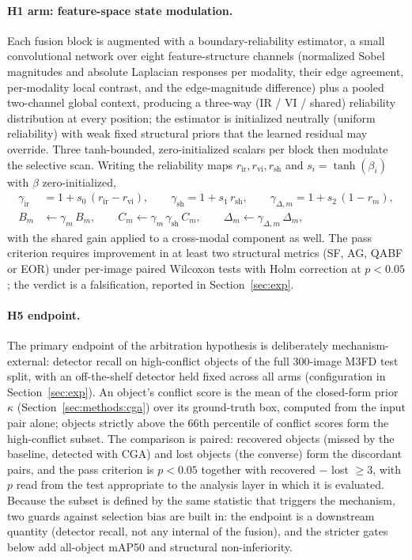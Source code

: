 \documentclass[pdflatex,sn-mathphys-num]{sn-jnl}
\theoremstyle{thmstyleone}%
\theoremstyle{thmstyletwo}%
\theoremstyle{thmstylethree}%
\begin{document}
\paragraph{H1 arm: feature-space state modulation.}
Each fusion block is augmented with a boundary-reliability estimator, a small convolutional network over eight feature-structure channels (normalized Sobel magnitudes and absolute Laplacian responses per modality, their edge agreement, per-modality local contrast, and the edge-magnitude difference) plus a pooled two-channel global context, producing a three-way (IR / VI / shared) reliability distribution at every position; the estimator is initialized neutrally (uniform reliability) with weak fixed structural priors that the learned residual may override. Three tanh-bounded, zero-initialized scalars per block then modulate the selective scan. Writing the reliability maps $r_{\mathrm{ir}}, r_{\mathrm{vi}}, r_{\mathrm{sh}}$ and $s_i = \tanh(\beta_i)$ with $\beta$ zero-initialized,
\begin{align}
\gamma_{\mathrm{ir}} &= 1 + s_0\,(r_{\mathrm{ir}} - r_{\mathrm{vi}}), \qquad \gamma_{\mathrm{sh}} = 1 + s_1\, r_{\mathrm{sh}}, \qquad \gamma_{\Delta,m} = 1 + s_2\,(1 - r_m), \nonumber\\
B_m &\leftarrow \gamma_m\, B_m, \qquad C_m \leftarrow \gamma_m\, \gamma_{\mathrm{sh}}\, C_m, \qquad \Delta_m \leftarrow \gamma_{\Delta,m}\, \Delta_m,
\label{eq:h1mod}
\end{align}
with the shared gain applied to a cross-modal component as well. The pass criterion requires improvement in at least two structural metrics (SF, AG, QABF or EOR) under per-image paired Wilcoxon tests with Holm correction at $p < 0.05$; the verdict is a falsification, reported in Section~\ref{sec:exp}.

\paragraph{H5 endpoint.}
The primary endpoint of the arbitration hypothesis is deliberately mechanism-external: detector recall on high-conflict objects of the full 300-image M3FD test split, with an off-the-shelf detector held fixed across all arms (configuration in Section~\ref{sec:exp}). An object's conflict score is the mean of the closed-form prior $\kappa$ (Section~\ref{sec:methods:cga}) over its ground-truth box, computed from the input pair alone; objects strictly above the 66th percentile of conflict scores form the high-conflict subset. The comparison is paired: recovered objects (missed by the baseline, detected with CGA) and lost objects (the converse) form the discordant pairs, and the pass criterion is $p < 0.05$ together with recovered $-$ lost $\geq 3$, with $p$ read from the test appropriate to the analysis layer in which it is evaluated. Because the subset is defined by the same statistic that triggers the mechanism, two guards against selection bias are built in: the endpoint is a downstream quantity (detector recall, not any internal of the fusion), and the stricter gates below add all-object mAP50 and structural non-inferiority.
\end{document}
